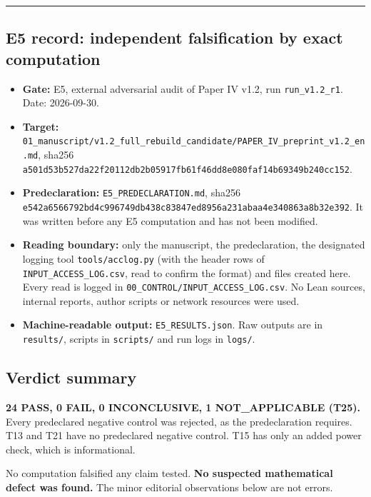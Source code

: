 \documentclass[
]{article}
\providecommand{\tightlist}{%
  \setlength{\itemsep}{0pt}\setlength{\parskip}{0pt}}
\begin{document}
\begin{center}\rule{0.5\linewidth}{0.5pt}\end{center}

\subsection{E5 record: independent falsification by exact
computation}\label{e5-record-independent-falsification-by-exact-computation}

\begin{itemize}
\tightlist
\item
  \textbf{Gate:} E5, external adversarial audit of Paper IV v1.2, run
  \texttt{run\_v1.2\_r1}. Date: 2026-09-30.
\item
  \textbf{Target:}
  \texttt{01\_manuscript/v1.2\_full\_rebuild\_candidate/PAPER\_IV\_preprint\_v1.2\_en.md},
  sha256
  \texttt{a501d53b527da22f20112db2b05917fb61f46dd8e080faf14b69349b240cc152}.
\item
  \textbf{Predeclaration:} \texttt{E5\_PREDECLARATION.md}, sha256
  \texttt{e542a6566792bd4c996749db438c83847ed8956a231abaa4e340863a8b32e392}.
  It was written before any E5 computation and has not been modified.
\item
  \textbf{Reading boundary:} only the manuscript, the predeclaration,
  the designated logging tool \texttt{tools/acclog.py} (with the header
  rows of \texttt{INPUT\_ACCESS\_LOG.csv}, read to confirm the format)
  and files created here. Every read is logged in
  \texttt{00\_CONTROL/INPUT\_ACCESS\_LOG.csv}. No Lean sources, internal
  reports, author scripts or network resources were used.
\item
  \textbf{Machine-readable output:} \texttt{E5\_RESULTS.json}. Raw
  outputs are in \texttt{results/}, scripts in \texttt{scripts/} and run
  logs in \texttt{logs/}.
\end{itemize}

\subsection{Verdict summary}\label{verdict-summary}

\textbf{24 PASS, 0 FAIL, 0 INCONCLUSIVE, 1 NOT\_APPLICABLE (T25).} Every
predeclared negative control was rejected, as the predeclaration
requires. T13 and T21 have no predeclared negative control. T15 has only
an added power check, which is informational.

No computation falsified any claim tested. \textbf{No suspected
mathematical defect was found.} The minor editorial observations below
are not errors.
\end{document}
